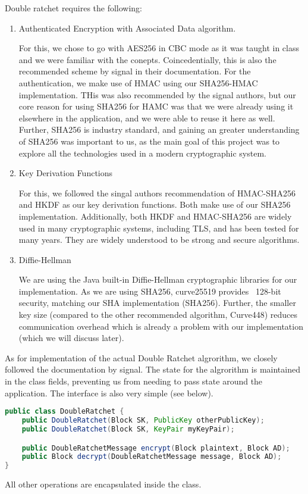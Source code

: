 Double ratchet requires the following:
\begin{enumerate}
    \item Authenticated Encryption with Associated Data algorithm.
        
        For this, we chose to go with AES256 in CBC mode as it was taught in class
        and we were familiar with the conepts. Coincedentially, this is also the recommended 
        scheme by signal in their documentation. For the authentication, we make use of HMAC using 
        our SHA256-HMAC implementation. THis was also recommended by the signal authors, but our core
        reason for using SHA256 for HAMC was that we were already using it elsewhere in the application,
        and we were able to reuse it here as well. Further, SHA256 is industry standard, and gaining an 
        greater understanding of SHA256 was important to us, as the main goal of this project was to 
        explore all the technologies used in a modern cryptographic system.

    \item Key Derivation Functions 

        For this, we followed the singal authors recommendation of HMAC-SHA256 and HKDF as our 
        key derivation functions. Both make use of our SHA256 implementation. Additionally,
        both HKDF and HMAC-SHA256 are widely used in many cryptographic systems, including TLS,
        and has been tested for many years. They are widely understood to be strong and secure algorithms.

    \item Diffie-Hellman

        We are using the Java built-in Diffie-Hellman cryptographic libraries for our implementation.
        As we are using SHA256, curve25519 provides ~128-bit security, matching our SHA implementation (SHA256).
        Further, the smaller key size (compared to the other recommended algorithm, Curve448) reduces communication
        overhead which is already a problem with our implementation (which we will discuss later).
\end{enumerate}

As for implementation of the actual Double Ratchet algrorithm, we closely followed the documentation by signal.
The state for the algrorithm is maintained in the class fields, preventing us from needing to pass state around the application.
The interface is also very simple (see below).
\begin{lstlisting}[language=Java]
public class DoubleRatchet {
    public DoubleRatchet(Block SK, PublicKey otherPublicKey);
    public DoubleRatchet(Block SK, KeyPair myKeyPair);

    public DoubleRatchetMessage encrypt(Block plaintext, Block AD);
    public Block decrypt(DoubleRatchetMessage message, Block AD);
}
\end{lstlisting}
All other operations are encapsulated inside the class.


